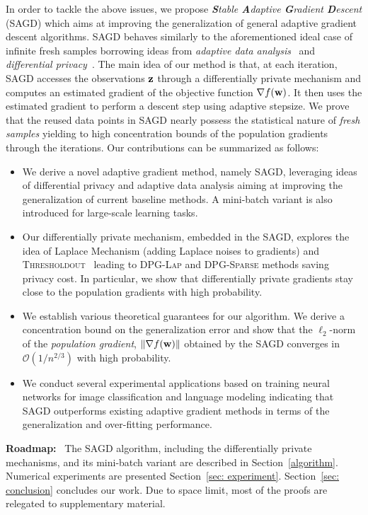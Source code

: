 \documentclass[11pt]{article}
\begin{document}
In order to tackle the above issues, we propose \textit{\textbf{S}table \textbf{A}daptive \textbf{G}radient \textbf{D}escent} (\textsc{SAGD}) which aims at improving the generalization of general adaptive gradient descent algorithms.
\textsc{SAGD} behaves similarly to the aforementioned ideal case of infinite fresh samples borrowing ideas from \emph{adaptive data analysis}~\citep{dwfe2015a} and \emph{differential privacy}~\citep{dwro2014}. 
The main idea of our method is that, at each iteration, \textsc{SAGD} accesses the observations $\mathbf{z}$ through a differentially private mechanism and computes an estimated gradient 
of the objective function $\nabla f(\mathbf{w})$. 
It then uses the estimated gradient to perform a descent step using adaptive stepsize. 
We prove that the reused data points in \textsc{SAGD} nearly possess the statistical nature of \emph{fresh samples} yielding to high concentration bounds of the population gradients through the iterations. Our  contributions  can be summarized as follows:
\begin{itemize}
\item We derive a novel adaptive gradient method, namely \textsc{SAGD}, leveraging ideas of differential privacy and adaptive data analysis aiming at improving the generalization of current baseline methods. A mini-batch variant is also introduced for large-scale learning tasks.
\item Our differentially private mechanism, embedded in the \textsc{SAGD}, explores the idea of Laplace Mechanism (adding Laplace noises to gradients) and \textsc{Thresholdout}~\citep{dwro2014} leading to \textsc{DPG-Lap} and \textsc{DPG-Sparse} methods saving privacy cost. 
In particular, we show that differentially private gradients stay close to the population gradients with high probability. 
\item We establish various theoretical guarantees for our algorithm. We derive a concentration bound on the generalization error and show that the $\ell_2$-norm of the \emph{population gradient}, \ie $\|\nabla f(\mathbf{w})\|$ obtained by the \textsc{SAGD} converges in $\mathcal{O}(1/n^{2/3})$ with high probability. 
\item We conduct several experimental applications based on training neural networks for image classification and language modeling indicating that \textsc{SAGD} outperforms existing adaptive gradient methods in terms of the generalization and over-fitting performance.
\end{itemize}
\textbf{Roadmap:} \ 
The \textsc{SAGD} algorithm, including the differentially private mechanisms, and its mini-batch variant are described in Section~\ref{algorithm}. 
Numerical experiments are presented Section~\ref{sec: experiment}. 
Section~\ref{sec: conclusion} concludes our work. 
Due to space limit, most of the proofs are relegated to supplementary material.
\end{document}
